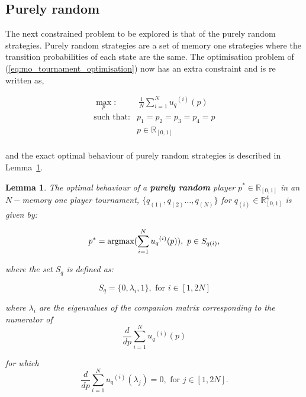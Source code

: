 \documentclass[10pt]{article}
\newcommand{\R}{\mathbb{R}}
\newtheorem{lemma}[theorem]{Lemma}
\begin{document}
\subsection{Purely random}\label{section:purely_analytical}

The next constrained problem to be explored is that of the purely random strategies.
Purely random strategies are a set of memory one strategies where the transition
probabilities of each state are the same. The optimisation problem of (\ref{eq:mo_tournament_optimisation})
now has an extra constraint and is re written as,

\begin{equation}\label{eq:random_optimisation}
\begin{aligned}
\max_p: & \ \frac{1}{N} \sum_{i=1} ^ {N} {u_q}^{(i)} (p) 
\\
\text{such that}: & p_1 = p_2 = p_3 = p_4 = p \\
                  & p \in \R_{[0, 1]} \\
\end{aligned}
\end{equation}

and the exact optimal behaviour of purely random strategies is described in
Lemma~\ref{lemma:purely_optimisation}.

\begin{lemma}
    \label{lemma:purely_optimisation}
    The optimal behaviour of a \textbf{purely random} player \(p ^ * \in \R_{[0, 1]}\)
    in an \(N-\)memory one player tournament, \(\{q_{(1)}, q_{(2)} \dots,q_{(N)} \}
    \) for \(q_{(i)} \in \R_{[0, 1]} ^ 4\) is given by:
    
    \[p^* = \textnormal{argmax}(\sum_{i=1} ^ {N} {u_q}^{(i)} (p) ), \ p \in S_{q(i)},\]
    
    where the set \(S_{q}\) is defined as:
    
    \[S_{q} = \{0, \lambda_i, 1\},\text{ for } i \in [1, 2N]\]

    where \(\lambda_i\) are the eigenvalues of the companion matrix corresponding
    to the numerator of \[\frac{d}{dp} \sum_{i=1} ^ {N} {u_q}^{(i)} (p)\]

    for which
    \[\frac{d}{dp} \sum_{i=1} ^ {N} {u_q}^{(i)} (\lambda_j) = 0,\text{ for } j \in [1, 2N].\]
\end{lemma}
\end{document}
